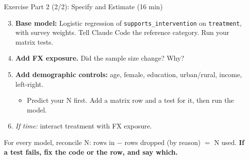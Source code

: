 \documentclass[aspectratio=169, 11pt]{beamer}
\begin{document}
\begin{frame}{Exercise Part 2 (2/2): Specify and Estimate (16 min)}
  \begin{enumerate}
    \setcounter{enumi}{2}
    \item \textbf{Base model:} Logistic regression of \texttt{supports\_intervention} on \texttt{treatment}, with survey weights. Tell Claude Code the reference category. Run your matrix tests.

    \vspace{0.2em}
    \item \textbf{Add FX exposure.} Did the sample size change? Why?

    \vspace{0.2em}
    \item \textbf{Add demographic controls:} age, female, education, urban/rural, income, left-right.
    \begin{itemize}
      \small
      \item \alert{Predict your N first.} Add a matrix row and a test for it, then run the model.
    \end{itemize}

    \vspace{0.2em}
    \item \textit{If time:} interact treatment with FX exposure.
  \end{enumerate}

  \vspace{0.4em}
  {\small \alert{For every model, reconcile N:} rows in $-$ rows dropped (by reason) $=$ N used. \textbf{If a test fails, fix the code or the row, and say which.}}
\end{frame}
\end{document}

